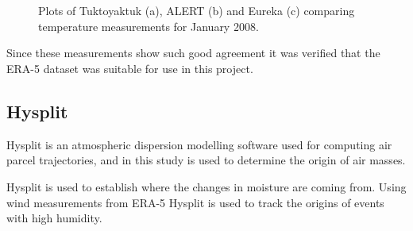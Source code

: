 \documentclass[12pt, oneside]{article}
\begin{document}
\begin{figure}[h!]
  \centering
   \\
   \\
  \caption{Plots of Tuktoyaktuk (a), ALERT (b) and Eureka (c) comparing temperature measurements for January 2008.} \label{fig:AB4}
\end{figure}

Since these measurements show such good agreement it was verified that the ERA-5 dataset was suitable for use in this project. 

\newpage

\subsection{Hysplit}
Hysplit is an atmospheric dispersion modelling software used for computing air parcel trajectories, and in this study is used to determine the origin of air masses. 

Hysplit is used to establish where the changes in moisture are coming from. Using wind measurements from ERA-5 Hysplit is used to track the origins of events with high humidity. 
\newpage 


%
 {}

\end{document}
